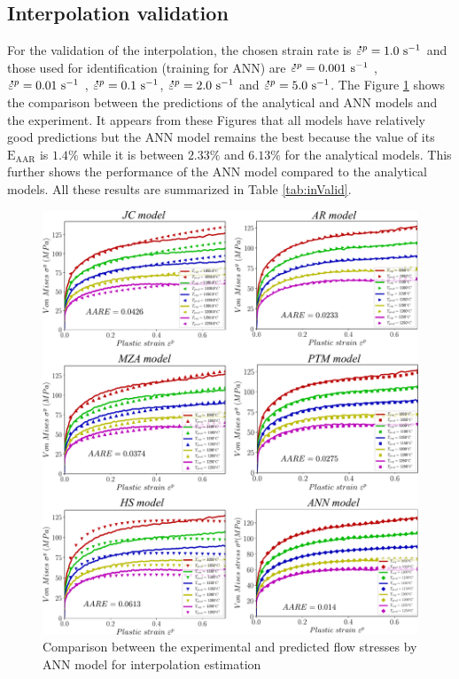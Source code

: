 \documentclass[twoside,english,1p,final,sort&compress]{elsarticle}
\theoremstyle{plain}
\newcommand{\mdot}[1]{\accentset{\mbox{\bfseries .}}{#1}}
\newcommand{\AARE}{\text{E}_\text{AAR}}
\begin{document}
\subsection{Interpolation validation}
For the validation of the interpolation, the chosen strain rate is $\mdot\varepsilon^p = 1.0\ \text{s}^{-1}$ and those used for identification (training for ANN) are $\mdot\varepsilon^p = 0.001\ \text{s}^{-1}$ , $\mdot\varepsilon^p = 0.01\ \text{s}^{-1}$ , $\mdot\varepsilon^p = 0.1\ \text{s}^{-1}$, $\mdot\varepsilon^p = 2.0\ \text{s}^{-1}$  and $\mdot\varepsilon^p = 5.0\ \text{s}^{-1}$. The Figure \ref{fig:inCombinaison} shows the comparison between the predictions of the analytical and ANN models and the experiment. It appears from these Figures that all models have relatively good predictions but the ANN model remains the best because the value of its $\AARE$ is $1.4\%$ while it is between $2.33\%$ and $6.13\%$ for the analytical models. This further shows the performance of the ANN model compared to the analytical models. All these results are summarized in Table \ref{tab:inValid}.
\begin{figure}[!ht]
\centering
\includegraphics[width=1.02\columnwidth]
{Figures/inCombinaison}
\caption{Comparison between the experimental and predicted flow stresses by ANN model for interpolation estimation}
\label{fig:inCombinaison}
\end{figure}
\end{document}
